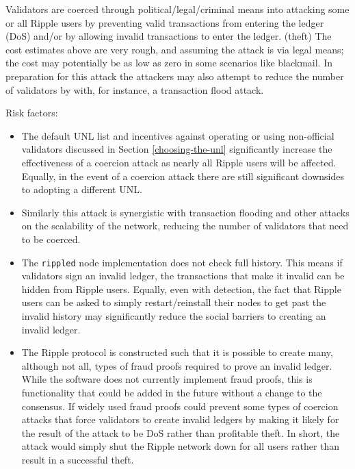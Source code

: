 \documentclass{article}
\begin{document}
Validators are coerced through political/legal/criminal means into attacking
some or all Ripple users by preventing valid transactions from entering the
ledger (DoS) and/or by allowing invalid transactions to enter the ledger.
(theft) The cost estimates above are very rough, and assuming the attack is via
legal means; the cost may potentially be as low as zero in some scenarios like
blackmail. In preparation for this attack the attackers may also attempt to
reduce the number of validators by with, for instance, a transaction flood
attack.

Risk factors:

\begin{itemize}

    \item The default UNL list and incentives against operating or using
        non-official validators discussed in Section \ref{choosing-the-unl}
        significantly increase the effectiveness of a coercion attack as nearly
        all Ripple users will be affected. Equally, in the event of a coercion
        attack there are still significant downsides to adopting a different
        UNL.

    \item Similarly this attack is synergistic with transaction flooding and
        other attacks on the scalability of the network, reducing the number of
        validators that need to be coerced.

    \item The \texttt{rippled} node implementation does not check full history. This
        means if validators sign an invalid ledger, the transactions that make
        it invalid can be hidden from Ripple users. Equally, even with
        detection, the fact that Ripple users can be asked to simply
        restart/reinstall their nodes to get past the invalid history may
        significantly reduce the social barriers to creating an invalid ledger.

    \item The Ripple protocol is constructed such that it is possible to create
        many, although not all, types of fraud
        proofs\cite{irc-btcdev-gmaxwell-fraud-proof, btctalk-pkt-fraud-proofs}
        required to prove an invalid ledger. While the software does not
        currently implement fraud proofs, this is functionality that could be
        added in the future without a change to the consensus. If widely used
        fraud proofs could prevent some types of coercion attacks that force
        validators to create invalid ledgers by making it likely for the result
        of the attack to be DoS rather than profitable theft. In short, the
        attack would simply shut the Ripple network down for all users rather
        than result in a successful theft.


\end{itemize}
\end{document}
